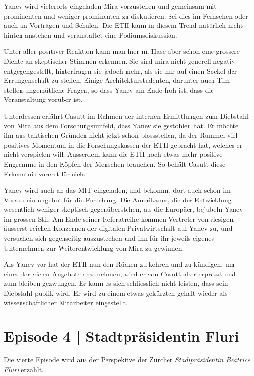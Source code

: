 \documentclass[11pt,a4paper,ngerman]{scrreprt}
\begin{document}
Yanev wird vielerorts eingeladen Mira vorzustellen und gemeinsam mit prominenten
und weniger prominenten zu diskutieren. Sei dies im Fernsehen oder auch an
Vorträgen und Schulen. Die ETH kann in diesem Trend natürlich nicht hinten
anstehen und veranstaltet eine Podiumsdiskussion.

Unter aller positiver Reaktion kann man hier im Hase aber schon eine grössere
Dichte an skeptischer Stimmen erkennen. Sie sind mira nicht generell negativ
entgegengestellt, hinterfragen sie jedoch mehr, als sie nur auf einen Sockel der
Errungenschaft zu stellen. Einige Architekturstudenten, darunter auch Tim
stellen ungemütliche Fragen, so dass Yanev am Ende froh ist, dass die
Veranstaltung vorüber ist.

Unterdessen erfährt Casutt im Rahmen der internen Ermittlungen zum Diebstahl
von Mira aus dem Forschungsumfeld, dass Yanev sie gestohlen hat. Er möchte ihn
aus taktischen Gründen nicht jetzt schon blossstellen, da der Rummel viel
positives Momentum in die Forschungskassen der ETH gebracht hat, welches er
nicht verspielen will. Ausserdem kann die ETH noch etwas mehr positive Engramme
in den Köpfen der Menschen brauchen. So behält Casutt diese Erkenntnis vorerst
für sich.

Yanev wird auch an das MIT eingeladen, und bekommt dort auch schon im Voraus ein
angebot für die Forschung. Die Amerikaner, die der Entwicklung wesentlich
weniger skeptisch gegenüberstehen, als die Europäer, bejubeln Yanev im grossen
Stil. Am Ende seiner Referatreihe kommen Vertreter von riesigen, äusserst
reichen Konzernen der digitalen Privatwirtschaft auf Yanev zu, und versuchen
sich gegenseitig auszustechen und ihn für ihr jeweils eigenes Unternehmen zur
Weiterentwicklung von Mira zu gewinnen.

Als Yanev vor hat der ETH nun den Rücken zu kehren und zu kündigen, um eines der
vielen Angebote anzunehmen, wird er von Casutt aber erpresst und zum bleiben
gezwungen. Er kann es sich schliesslich nicht leisten, dass sein Diebstahl
publik wird. Er wird zu einem etwas gekürzten gehalt wieder als
wissenschaftlicher Mitarbeiter eingestellt.

\section*{Episode 4 | Stadtpräsidentin Fluri}

Die vierte Episode wird aus der Perspektive der Zürcher \emph{Stadtpräsidentin
Beatrice Fluri} erzählt.
\end{document}
